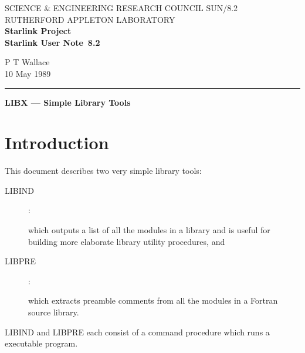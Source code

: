 \pagestyle{myheadings}

\newcommand{\stardoccategory}  {Starlink User Note}
\newcommand{\stardocinitials}  {SUN}
\newcommand{\stardocnumber}    {8.2}
\newcommand{\stardocauthors}   {P T Wallace}
\newcommand{\stardocdate}      {10 May 1989}
\newcommand{\stardoctitle}     {LIBX --- Simple Library Tools}

\newcommand{\stardocname}{\stardocinitials /\stardocnumber}
\markright{\stardocname}
\setlength{\textwidth}{160mm}
\setlength{\textheight}{240mm}
\setlength{\topmargin}{-5mm}
\setlength{\oddsidemargin}{0mm}
\setlength{\evensidemargin}{0mm}
\setlength{\parindent}{0mm}
\setlength{\parskip}{\medskipamount}
\setlength{\unitlength}{1mm}


\thispagestyle{empty}
SCIENCE \& ENGINEERING RESEARCH COUNCIL \hfill \stardocname\\
RUTHERFORD APPLETON LABORATORY\\
{\large\bf Starlink Project\\}
{\large\bf \stardoccategory\ \stardocnumber}
\begin{flushright}
\stardocauthors\\
\stardocdate
\end{flushright}
\vspace{-4mm}
\rule{\textwidth}{0.5mm}
\vspace{5mm}
\begin{center}
{\Large\bf \stardoctitle}
\end{center}
\vspace{5mm}

\section{Introduction}

This document describes two very simple library tools:
\begin{description}
\item [LIBIND] :

which outputs a list of all the modules in a library and is useful
for building more elaborate library utility procedures, and

\item [LIBPRE] :

which extracts preamble comments from all the modules
in a Fortran source library.
\end{description}
LIBIND and LIBPRE each consist of a command procedure which
runs a executable program.

